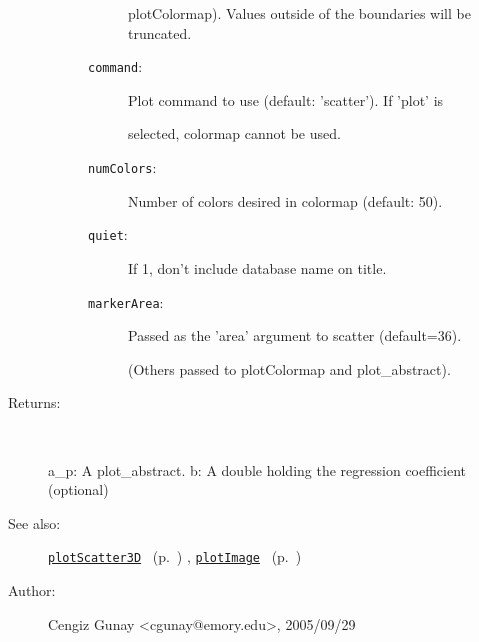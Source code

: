 \begin{description}
\begin{description}
\begin{description}
plotColormap). Values outside of the boundaries will be truncated.
\item[\texttt{command}:]
 Plot command to use (default: 'scatter'). If 'plot' is

selected, colormap cannot be used.
\item[\texttt{numColors}:]
 Number of colors desired in colormap (default: 50).
\item[\texttt{quiet}:]
 If 1, don't include database name on title.
\item[\texttt{markerArea}:]
 Passed as the 'area' argument to scatter (default=36).

(Others passed to plotColormap and plot\_abstract).
\end{description}%
\end{description}%
%
\item[Returns:
]~

   a\_p: A plot\_abstract.
   b: A double holding the regression coefficient (optional)
%
%
\item[See also:]%
\hyperlink{ref_plotScatter3D}{\texttt{plotScatter3D}}%
\ (p.~\pageref{ref_plotScatter3D})%
%
, \hyperlink{ref_plotImage}{\texttt{plotImage}}%
\ (p.~\pageref{ref_plotImage})%
%
%
\item[Author:]%
Cengiz Gunay <cgunay@emory.edu>, 2005/09/29
%
\end{description}
\methodline%

